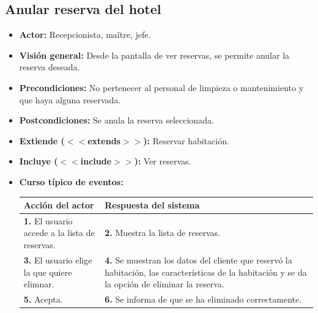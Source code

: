 \documentclass[spanish,a4paper,11pt, twoside]{report}	%
\begin{document}
	\subsection{Anular reserva del hotel}
		\begin{itemize}
			\item \textbf{Actor:} Recepcionista, maître, jefe.
			\item \textbf{Visión general:} Desde la pantalla de ver reservas, se permite anular la reserva deseada. 		
			\item \textbf{Precondiciones:} No pertenecer al personal de limpieza o mantenimiento y que haya alguna reservada.
			\item \textbf{Postcondiciones:} Se anula la reserva seleccionada.
			\item \textbf{Extiende ($<<$extends$>>$):} Reservar habitación.
			\item \textbf{Incluye ($<<$include$>>$):} Ver reservas.
			\item \textbf{Curso típico de eventos:}\\ 
				\begin{tabular}{|p{6cm}||p{6cm}|}
					\hline
					\textbf{Acción del actor} & \textbf{Respuesta del sistema} \\ \hline \hline
					\textbf{1.} El usuario accede a la lista de reservas. & 
					\textbf{2.} Muestra la lista de reservas.\\ \hline 
					\textbf{3.} El usuario elige la que quiere elimnar. & 
					\textbf{4.} Se muestran los datos del cliente que reservó la habitación, 
					las características de la habitación y se da la opción de eliminar la reserva.\\ \hline 
					\textbf{5.} Acepta. & 
					\textbf{6.} Se informa de que se ha eliminado correctamente.\\ \hline 
				\end{tabular}
		\end {itemize}

\end{document}

